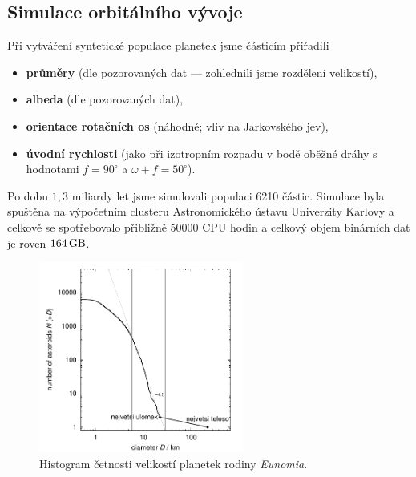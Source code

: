 \documentclass[a4paper, 12pt]{article}
\begin{document}
\subsection{Simulace orbitálního vývoje}

Při vytváření syntetické populace planetek jsme částicím přiřadili 
\begin{itemize}
\itemsep0em
\item \textbf{průměry} (dle pozorovaných dat --- zohlednili jsme rozdělení velikostí), 
\item \textbf{albeda} (dle pozorovaných dat),
\item \textbf{orientace rotačních os} (náhodně; vliv na Jarkovského jev),
\item \textbf{úvodní rychlosti} (jako při izotropním rozpadu v bodě oběžné dráhy s hodnotami $f=90^\circ$ a $\omega+f=50^\circ$).
\end{itemize}


Po dobu $1,3$ miliardy let jsme simulovali populaci 6210 částic. Simulace byla spuštěna na výpočetním clusteru Astronomického ústavu Univerzity Karlovy a celkově se spotřebovalo přibližně 50000 CPU hodin a celkový objem binárních dat je roven $164\,{\rm GB}$.

\begin{figure}
	\centering
	\includegraphics[width=0.6\textwidth]{../../obr/size_distribution}
	\caption{Histogram četnosti velikostí planetek rodiny \textit{Eunomia}.} 

	\label{fig:sfd}
\end{figure}
\end{document}
